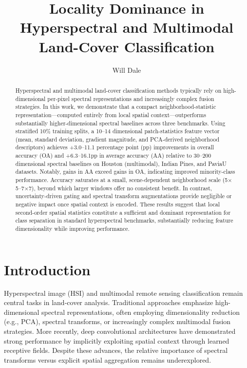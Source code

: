 \documentclass[
  journal]{IEEEtran}
\title{Locality Dominance in Hyperspectral and Multimodal Land-Cover
Classification}
\author{Will Dale}
\date{}
\begin{document}
\maketitle

\begin{abstract}

Hyperspectral and multimodal land-cover classification methods typically
rely on high-dimensional per-pixel spectral representations and
increasingly complex fusion strategies. In this work, we demonstrate
that a compact neighborhood-statistic representation---computed entirely
from local spatial context---outperforms substantially
higher-dimensional spectral baselines across three benchmarks. Using
stratified 10\% training splits, a 10--14 dimensional patch-statistics
feature vector (mean, standard deviation, gradient magnitude, and
PCA-derived neighborhood descriptors) achieves +3.0--11.1 percentage
point (pp) improvements in overall accuracy (OA) and +6.3--16.1pp in
average accuracy (AA) relative to 30--200 dimensional spectral baselines
on Houston (multimodal), Indian Pines, and PaviaU datasets. Notably,
gains in AA exceed gains in OA, indicating improved minority-class
performance. Accuracy saturates at a small, scene-dependent neighborhood
scale (5\(\times\)5--7\(\times\)7), beyond which larger windows offer no consistent
benefit. In contrast, uncertainty-driven gating and spectral transform
augmentations provide negligible or negative impact once spatial context
is encoded. These results suggest that local second-order spatial
statistics constitute a sufficient and dominant representation for class
separation in standard hyperspectral benchmarks, substantially reducing
feature dimensionality while improving performance.

\end{abstract}

\section{Introduction}

Hyperspectral image (HSI) and multimodal remote sensing classification
remain central tasks in land-cover analysis. Traditional approaches
emphasize high-dimensional spectral representations, often employing
dimensionality reduction (e.g., PCA), spectral transforms, or
increasingly complex multimodal fusion strategies. More recently, deep
convolutional architectures have demonstrated strong performance by
implicitly exploiting spatial context through learned receptive fields.
Despite these advances, the relative importance of spectral transforms
versus explicit spatial aggregation remains underexplored.
\end{document}
